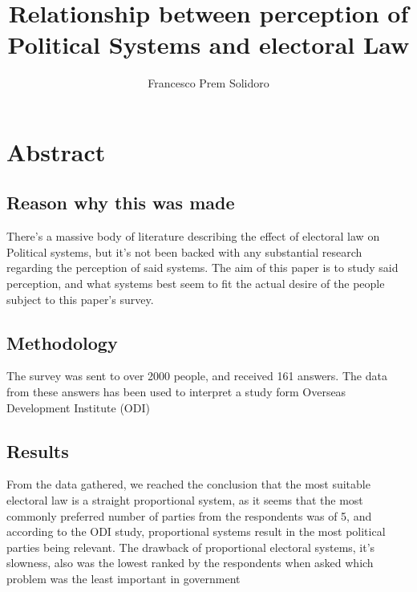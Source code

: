 \documentclass{article}
\title{Relationship between perception of Political Systems and electoral Law}
\author{Francesco Prem Solidoro}
\begin{document}
\maketitle
\section{Abstract} %
\label{sec:Abstract}
\subsection{Reason why this was made} %
\label{sub:Reason why this was made}

There's a massive body of literature describing the effect of electoral law on Political systems, but it's not been backed with any substantial research regarding the perception of said systems. The aim of this paper is to study said perception, and what systems best seem to fit the actual desire of the people subject to this paper's survey.

\subsection{Methodology} %
\label{sec:Methodology}
The survey was sent to over 2000 people, and received 161 answers. The data from these answers has been used to interpret a study form Overseas Development Institute (ODI) ~\cite{ODI-electoral-systems}


\subsection{Results}
From the data gathered, we reached the conclusion that the most suitable electoral law is a straight proportional system, as it seems that the most commonly preferred number of parties from the respondents was of 5, and according to the ODI study, proportional systems result in the most political parties being relevant. The drawback of proportional electoral systems, it's slowness, also was the lowest ranked by the respondents when asked which problem was the least important in government

\printbibliography
	
\end{document}
